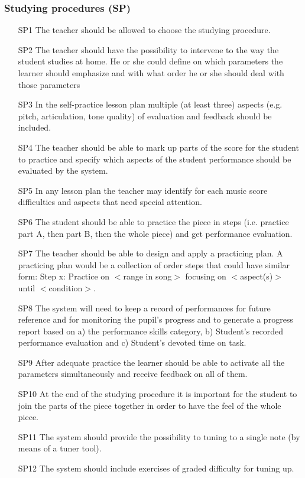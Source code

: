 \subsubsection{Studying procedures (SP)}
\begin{itemize} \itemsep0em
\item[SP1] The teacher should be allowed to choose the studying procedure.
\item[SP2] The teacher should have the possibility to intervene to the way the student studies at home. He or she could define on which parameters the learner should emphasize and with what order he or she should deal with those parameters
\item[SP3] In the self-practice lesson plan multiple (at least three) aspects (e.g. pitch, articulation, tone quality) of evaluation and feedback should be included.
\item[SP4] The teacher should be able to mark up parts of the score for the student to practice and specify which aspects of the student performance should be evaluated by the system.
\item[SP5] In any lesson plan the teacher may identify for each music score difficulties and aspects that need special attention.
\item[SP6] The student should be able to practice the piece in steps (i.e. practice part A, then part B, then the whole piece) and get performance evaluation.
\item[SP7] The teacher should be able to design and apply a practicing plan. A practicing plan would be a collection of order steps that could have similar form: Step x: Practice on $<$range in song$>$ focusing on $<$aspect(s)$>$ until $<$condition$>$.
\item[SP8] The system will need to keep a record of performances for future reference and for monitoring the pupil's progress and to generate a progress report based on a) the performance skills category, b) Student’s recorded performance evaluation and c) Student’s devoted time on task.
\item[SP9] After adequate practice the learner should be able to activate all the parameters simultaneously and receive feedback on all of them.
\item[SP10] At the end of the studying procedure it is important for the student to join the parts of the piece together in order to have the feel of the whole piece.
\item[SP11] The system should provide the possibility to tuning to a single note (by means of a tuner tool).
\item[SP12] The system should include exercises of graded difficulty for tuning up.
\end{itemize}


